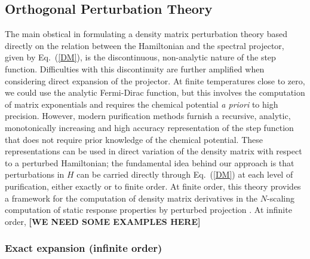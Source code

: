 \documentclass[twocolumn,showpacs,preprintnumbers,amsmath,amssymb]{revtex4}
\begin{document}
\subsection{Orthogonal Perturbation Theory}

The main obstical in formulating a density matrix perturbation theory 
based directly on the  relation between the Hamiltonian and the spectral projector,
given  by Eq.~(\ref{DM}), is the discontinuous, non-analytic nature of the
step function.  Difficulties with this discontinuity are further amplified when
considering direct expansion of the projector. At finite temperatures close to zero, 
we could  use the analytic Fermi-Dirac function, but this involves the computation of matrix 
exponentials and requires the chemical potential {\em a priori} to high precision.
However, modern purification methods furnish  a recursive, analytic, monotonically increasing and 
high accuracy representation of the step function that does not require prior knowledge of the
chemical potential.  These representations can be used  in  direct variation of the density matrix 
with respect to a perturbed Hamiltonian; the fundamental idea behind our approach is that perturbations 
in $H$ can be carried directly through Eq.~(\ref{DM}) at each level 
of purification, either exactly or to finite order.  At finite order, this theory 
provides a framework for the computation of density matrix derivatives in 
the $N$-scaling computation of static response properties by  perturbed projection 
\cite{ANiklasson03,VWeber05}. At infinite order, {\bf [WE NEED SOME EXAMPLES HERE]}

\subsubsection{Exact expansion (infinite order)}
\end{document}
